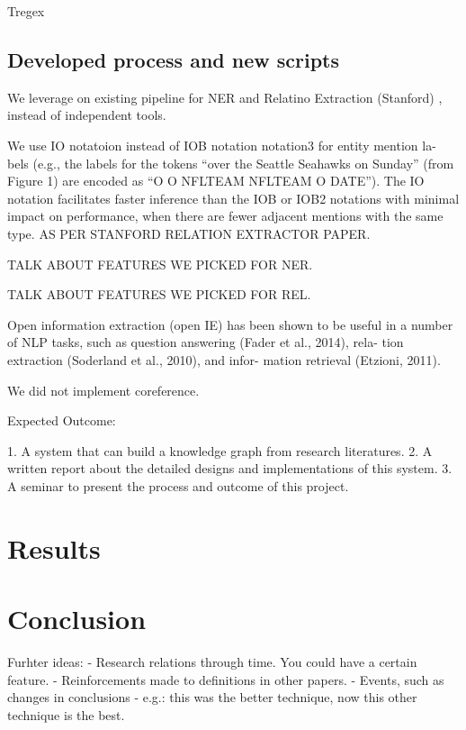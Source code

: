 \documentclass[11pt,a4paper,openright]{memoir}
\begin{document}
Tregex

\section{Developed process and new scripts}

We leverage on existing pipeline for NER and Relatino Extraction (Stanford) , instead of independent tools.

We use IO notatoion instead of IOB notation  notation3 for entity mention la- bels (e.g., the labels for the tokens “over the Seattle Seahawks on Sunday” (from Figure 1) are encoded as “O O NFLTEAM NFLTEAM O DATE”). The IO notation facilitates faster inference than the IOB or IOB2 notations with minimal impact on performance, when there are fewer adjacent mentions with the same type. AS PER STANFORD RELATION EXTRACTOR PAPER.

TALK ABOUT FEATURES WE PICKED FOR NER.

TALK ABOUT FEATURES WE PICKED FOR REL.

Open information extraction (open IE) has been shown to be useful in a number of NLP tasks, such as question answering (Fader et al., 2014), rela- tion extraction (Soderland et al., 2010), and infor- mation retrieval (Etzioni, 2011).

We did not implement coreference.

Expected Outcome:

1. A system that can build a knowledge graph from research literatures.  
2. A written report about the detailed designs and implementations of this system.
3. A seminar to present the process and outcome of this project.

\chapter{Results}

\chapter{Conclusion}

Furhter ideas:
- Research relations through time. You could have a certain feature.
- Reinforcements made to definitions in other papers.
- Events, such as changes in conclusions - e.g.: this was the better technique, now this other technique is the best.

\backmatter

\printbibliography

\appendix
\end{document}
